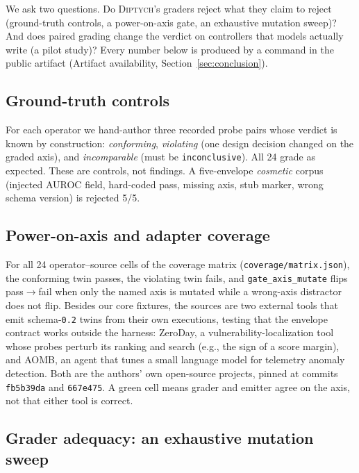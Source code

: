 \documentclass[conference]{IEEEtran}
\newcommand{\sys}{\textsc{Diptych}}
\begin{document}
	We ask two questions. Do \sys{}'s graders reject what they claim to reject
	(ground-truth controls, a power-on-axis gate, an exhaustive mutation
	sweep)? And does paired grading change the verdict on controllers that
	models actually write (a pilot study)? Every number below is produced by a
	command in the public artifact (Artifact availability,
	Section~\ref{sec:conclusion}).
	
	\subsection{Ground-truth controls}
	
	For each operator we hand-author three recorded probe pairs whose verdict
	is known by construction: \emph{conforming}, \emph{violating} (one design
	decision changed on the graded axis), and \emph{incomparable} (must be
	\texttt{inconclusive}). All 24 grade as expected. These are controls, not
	findings. A five-envelope \emph{cosmetic} corpus (injected AUROC field,
	hard-coded pass, missing axis, stub marker, wrong schema version) is
	rejected 5/5.
	
	\subsection{Power-on-axis and adapter coverage}
	\label{sec:adapters}
	
	For all 24 operator--source cells of the coverage matrix
	(\texttt{coverage/matrix.json}), the conforming twin passes, the violating
	twin fails, and \texttt{gate\_axis\_mutate} flips pass$\to$fail when only the named axis
	is mutated while a wrong-axis distractor does not flip. Besides our core
	fixtures, the sources are two external tools that emit
	schema-\texttt{0.2} twins from their own executions, testing that the
	envelope contract works outside the harness: ZeroDay, a
	vulnerability-localization tool whose probes perturb its ranking and
	search (e.g., the sign of a score margin), and AOMB, an agent that tunes a
	small language model for telemetry anomaly detection. Both are the
	authors' own open-source projects, pinned at commits \texttt{fb5b39da}
	and \texttt{667e475}. A green cell means grader and emitter agree on the
	axis, not that either tool is correct.
	
	
	
	\subsection{Grader adequacy: an exhaustive mutation sweep}
	\label{sec:eval-adequacy}
	
\end{document}
